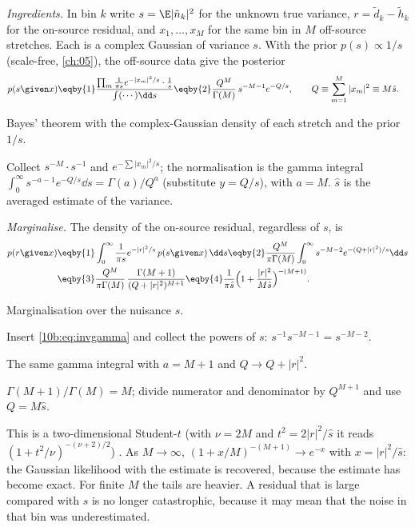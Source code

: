 \emph{Ingredients.} In bin $k$ write $s=\E|\tilde n_k|^2$ for the unknown true variance, $r=\tilde d_k-\tilde h_k$
for the on-source residual, and $x_1,\dots,x_M$ for the same bin in $M$ off-source stretches. Each is a complex
Gaussian of variance $s$. With the prior $p(s)\propto1/s$ (scale-free, \cref{ch:05}), the off-source data give the
posterior
\begin{align}
  p(s\given x)
  &\eqby{1}\frac{\prod_m\frac1{\pi s}e^{-|x_m|^2/s}\cdot\frac1s}{\int(\cdots)\dd s}
   \eqby{2}\frac{Q^M}{\Gamma(M)}\,s^{-M-1}e^{-Q/s},\qquad Q\equiv\sum_{m=1}^M|x_m|^2\equiv M\hat s .
  \label{10b:eq:invgamma}
\end{align}
\begin{explain}
  \item Bayes' theorem with the complex-Gaussian density of each stretch and the prior $1/s$.
  \item Collect $s^{-M}\cdot s^{-1}$ and $e^{-\sum|x_m|^2/s}$; the normalisation is the gamma integral
        $\int_0^\infty s^{-a-1}e^{-Q/s}\dd s=\Gamma(a)/Q^a$ (substitute $y=Q/s$), with $a=M$. $\hat s$ is the
        averaged estimate of the variance.
\end{explain}
\emph{Marginalise.} The density of the on-source residual, regardless of $s$, is
\begin{align}
  p(r\given x)
  &\eqby{1}\int_0^\infty\frac{1}{\pi s}e^{-|r|^2/s}\,p(s\given x)\,\dd s
   \eqby{2}\frac{Q^M}{\pi\Gamma(M)}\int_0^\infty s^{-M-2}e^{-(Q+|r|^2)/s}\dd s\nonumber\\
  &\eqby{3}\frac{Q^M}{\pi\Gamma(M)}\,\frac{\Gamma(M+1)}{(Q+|r|^2)^{M+1}}
   \eqby{4}\frac{1}{\pi\hat s}\Big(1+\frac{|r|^2}{M\hat s}\Big)^{-(M+1)} .
  \label{10b:eq:student-gw}
\end{align}
\begin{explain}
  \item Marginalisation over the nuisance $s$.
  \item Insert \eqref{10b:eq:invgamma} and collect the powers of $s$: $s^{-1}s^{-M-1}=s^{-M-2}$.
  \item The same gamma integral with $a=M+1$ and $Q\to Q+|r|^2$.
  \item $\Gamma(M+1)/\Gamma(M)=M$; divide numerator and denominator by $Q^{M+1}$ and use $Q=M\hat s$.
\end{explain}
This is a two-dimensional Student-$t$ (with $\nu=2M$ and $t^2=2|r|^2/\hat s$ it reads
$(1+t^2/\nu)^{-(\nu+2)/2}$) \cite{RoverMeyerChristensen2011}. As $M\to\infty$,
$(1+x/M)^{-(M+1)}\to e^{-x}$ with $x=|r|^2/\hat s$: the Gaussian likelihood with the estimate is recovered, because
the estimate has become exact. For finite $M$ the tails are heavier. A residual that is large compared with
$\hat s$ is no longer catastrophic, because it may mean that the noise in that bin was underestimated.

